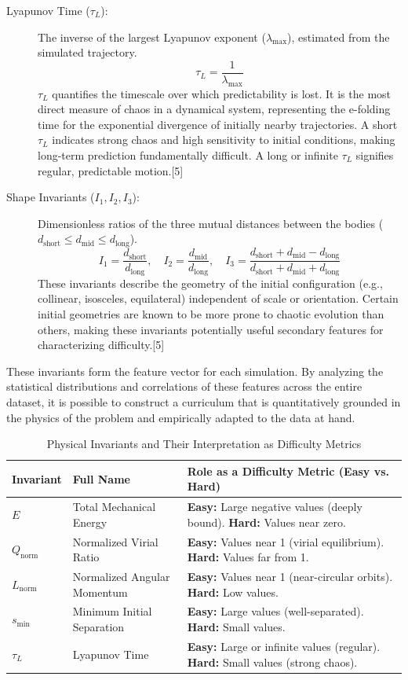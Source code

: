 \documentclass[11pt, letterpaper]{article}
\begin{document}
\begin{description}
    \item[Lyapunov Time ($\tau_L$):] The inverse of the largest Lyapunov exponent ($\lambda_{\text{max}}$), estimated from the simulated trajectory.
    $$\tau_{L} = \frac{1}{\lambda_{\text{max}}}$$
    $\tau_{L}$ quantifies the timescale over which predictability is lost. It is the most direct measure of chaos in a dynamical system, representing the e-folding time for the exponential divergence of initially nearby trajectories. A short $\tau_{L}$ indicates strong chaos and high sensitivity to initial conditions, making long-term prediction fundamentally difficult. A long or infinite $\tau_{L}$ signifies regular, predictable motion.[5]

    \item[Shape Invariants ($I_1, I_2, I_3$):] Dimensionless ratios of the three mutual distances between the bodies ($d_{\text{short}} \le d_{\text{mid}} \le d_{\text{long}}$).
    $$I_{1}=\frac{d_{\text{short}}}{d_{\text{long}}}, \quad I_{2}=\frac{d_{\text{mid}}}{d_{\text{long}}}, \quad I_{3}=\frac{d_{\text{short}}+d_{\text{mid}}-d_{\text{long}}}{d_{\text{short}}+d_{\text{mid}}+d_{\text{long}}}$$
    These invariants describe the geometry of the initial configuration (e.g., collinear, isosceles, equilateral) independent of scale or orientation. Certain initial geometries are known to be more prone to chaotic evolution than others, making these invariants potentially useful secondary features for characterizing difficulty.[5]
\end{description}

These invariants form the feature vector for each simulation. By analyzing the statistical distributions and correlations of these features across the entire dataset, it is possible to construct a curriculum that is quantitatively grounded in the physics of the problem and empirically adapted to the data at hand.

\begin{table}[H]
\centering
\caption{Physical Invariants and Their Interpretation as Difficulty Metrics}
\label{tab:invariants}
\begin{tabular}{@{}p{2cm}p{4cm}p{7cm}@{}}
\toprule
\textbf{Invariant} & \textbf{Full Name} & \textbf{Role as a Difficulty Metric (Easy vs. Hard)} \\ \midrule
$E$ & Total Mechanical Energy & \textbf{Easy:} Large negative values (deeply bound). \textbf{Hard:} Values near zero. \\
$Q_{\text{norm}}$ & Normalized Virial Ratio & \textbf{Easy:} Values near 1 (virial equilibrium). \textbf{Hard:} Values far from 1. \\
$L_{\text{norm}}$ & Normalized Angular Momentum & \textbf{Easy:} Values near 1 (near-circular orbits). \textbf{Hard:} Low values. \\
$s_{\text{min}}$ & Minimum Initial Separation & \textbf{Easy:} Large values (well-separated). \textbf{Hard:} Small values. \\
$\tau_{L}$ & Lyapunov Time & \textbf{Easy:} Large or infinite values (regular). \textbf{Hard:} Small values (strong chaos). \\ \bottomrule
\end{tabular}
\end{table}
\end{document}
